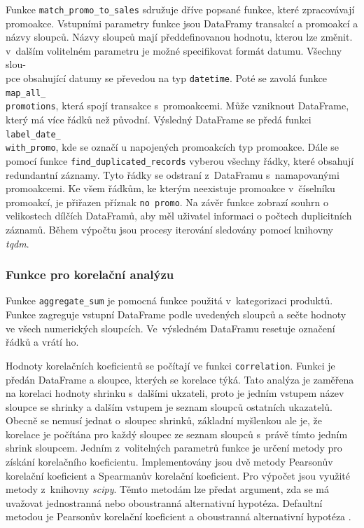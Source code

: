 Funkce \texttt{match\_promo\_to\_sales} sdružuje dříve popsané funkce, které zpracovávají promoakce. Vstupními parametry funkce jsou DataFramy transakcí a promoakcí a názvy sloupců. Názvy sloupců mají předdefinovanou hodnotu, kterou lze změnit. v~dalším volitelném parametru je možné specifikovat formát datumu. Všechny slou-\\pce obsahující datumy se převedou na typ \texttt{datetime}. Poté se zavolá funkce \texttt{map\_all\_\\promotions}, která spojí transakce s~promoakcemi. Může vzniknout DataFrame, který má více řádků než původní. Výsledný DataFrame se předá funkci \texttt{label\_date\_\\with\_promo}, kde se označí u napojených promoakcích typ promoakce. Dále se pomocí funkce \texttt{find\_duplicated\_records} vyberou všechny řádky, které obsahují redundantní záznamy. Tyto řádky se odstraní z~DataFramu s~namapovanými promoakcemi. Ke všem řádkům, ke kterým neexistuje promoakce v~číselníku promoakcí, je přiřazen příznak \texttt{no promo}. Na závěr funkce zobrazí souhrn o velikostech dílčích DataFramů, aby měl uživatel informaci o počtech duplicitních záznamů. Během výpočtu jsou procesy iterování sledovány pomocí knihovny \emph{tqdm}.

\subsubsection*{Funkce pro korelační analýzu}

Funkce \texttt{aggregate\_sum} je pomocná funkce použitá v~kategorizaci produktů. Funkce zagreguje vstupní DataFrame podle uvedených sloupců a sečte hodnoty ve všech numerických sloupcích. Ve~výsledném DataFramu resetuje označení řádků a vrátí ho.

Hodnoty korelačních koeficientů se počítají ve funkci \texttt{correlation}. Funkci je předán DataFrame a sloupce, kterých se korelace týká. Tato analýza je zaměřena na korelaci hodnoty shrinku s~dalšími ukzateli, proto je jedním vstupem název sloupce se shrinky a dalším vstupem je seznam sloupců ostatních ukazatelů. Obecně se nemusí jednat o~sloupec shrinků, základní myšlenkou ale je, že korelace je počítána pro každý sloupec ze seznam sloupců s~právě tímto jedním shrink sloupcem. Jedním z~volitelných parametrů funkce je určení metody pro získání korelačního koeficientu. Implementovány jsou dvě metody Pearsonův korelační koeficient a Spearmanův korelační koeficient. Pro výpočet jsou využité metody z~knihovny \emph{scipy}. Těmto metodám lze předat argument, zda se má uvažovat jednostranná nebo oboustranná alternativní hypotéza. Defaultní metodou je Pearsonův korelační koeficient a oboustranná alternativní hypotéza \cite{bib:scipyPearson}.

